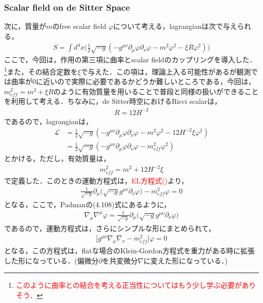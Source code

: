 \subsubsection{Scalar field on de Sitter Space}
次に，質量が$m$のfree scalar field $\varphi$について考える，lagrangianは次で与えられる，
\begin{align}
S=\int d^4x\biggr(\frac{1}{2}\sqrt{-g}(-g^{\mu\nu}\partial_{\mu}\varphi\partial_{\nu}\varphi-m^2\varphi^2-\xi R \varphi^2)\biggl)
\end{align}
ここで，今回は，作用の第三項に曲率とscalar fieldのカップリングを導入した．\footnote{\textcolor{red}{このように曲率との結合を考える正当性についてはもう少し学ぶ必要がありそう．}}また，その結合定数を$\xi$で与えた．この項は，理論上入る可能性があるが観測では曲率が0に近いので実際に必要であるかどうか難しいところである，今回は，$m_{eff}^2=m^2+\xi R$のように有効質量を用いることで普段と同様の扱いができることを利用して考える．ちなみに，de Sitter時空におけるRicci scalarは，
\begin{align}
  R=12H^{-2}
\end{align}
であるので，lagrangianは，
\begin{align}
  \label{1.60}
  \mathcal{L}&=\frac{1}{2}\sqrt{-g}(-g^{\mu\nu}\partial_{\mu}\varphi\partial_{\nu}\varphi-m^2\varphi^2-12H^{-2}\xi \varphi^2) \\
  \label{1.61}
  &=\frac{1}{2}\sqrt{-g}(-g^{\mu\nu}\partial_{\mu}\varphi\partial_{\nu}\varphi-m_{eff}^2\varphi^2)
\end{align}
とかける，ただし，有効質量は，
\begin{align}
  m_{eff}^2=m^2+12H^{-2}\xi
\end{align}
で定義した．このときの運動方程式は，\textcolor{red}{EL方程式()}より，
\begin{align}
    \frac{1}{\sqrt{-g}}\partial_{\mu}\biggl(\sqrt{-g}g^{\mu\nu}\partial_{\nu}\varphi
\biggr)
    -m_{eff}^2\varphi=0
\end{align}
となる，ここで，Padmanの(4.108)式にあるように，
\begin{align}
  \label{1.65}
  \nabla_{\mu}\nabla^{\mu}\varphi=\frac{1}{\sqrt{-g}}\partial_{\mu}\biggl(\sqrt{-g}g^{\mu\nu}\partial_{\nu}\varphi\biggr)
\end{align}
であるので，運動方程式は，さらにシンプルな形にまとめられて，
\begin{align}
  \label{1.66}
  \biggl[g^{\mu\nu}\nabla_{\mu}\nabla_{\nu}-m_{eff}^2\biggr]\varphi=0
\end{align}
となる，この方程式は，flatな場合のKlein-Gordon方程式を重力がある時に拡張した形になっている．(偏微分$\partial$を共変微分$\nabla$に変えた形になっている．)

